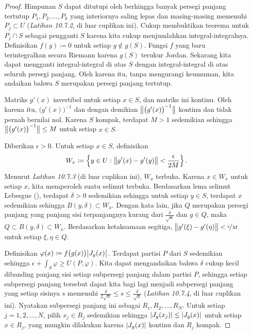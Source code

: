 \begin{proof}
Himpunan $S$ dapat ditutupi oleh berhingga banyak persegi panjang tertutup
$P_1,P_2,\ldots,P_k$ yang
interiornya saling lepas dan masing-masing memenuhi $P_j \subset U$
(\emph{Latihan 10.7.2}, di luar cuplikan ini).
Cukup membuktikan teorema untuk $P_j \cap S$ sebagai pengganti $S$
karena kita cukup menjumlahkan integral-integralnya.
Definisikan $f(y) \coloneqq 0$ untuk setiap $y \notin g(S)$.
Fungsi $f$ yang baru terintegralkan secara Riemann karena $g(S)$ terukur Jordan.
Sekarang kita dapat mengganti integral-integral di atas $S$ dengan integral-integral
di atas seluruh persegi panjang.
Oleh karena itu, tanpa mengurangi keumuman, kita andaikan bahwa $S$ merupakan persegi panjang tertutup.

Matriks $g'(x)$ invertibel untuk setiap $x \in S$,
dan matriks ini kontinu.  Oleh karena itu, ${\bigl(g'(x)\bigr)}^{-1}$
dan dengan demikian
$\bigl\lVert {{\bigl(g'(x)\bigr)}^{-1}} \bigr\rVert$ kontinu dan tidak pernah bernilai nol.
Karena $S$ kompak, terdapat $M > 1$ sedemikian sehingga
$\bigl\lVert {{\bigl(g'(x)\bigr)}^{-1}} \bigr\rVert \leq M$ untuk setiap $x \in S$.

Diberikan $\epsilon > 0$.
Untuk setiap $x \in S$, definisikan
\begin{equation*}
W_x \coloneqq
\left\{ y \in U : \bigl\lVert {g'(x)-g'(y)} \bigr\rVert < \frac{\epsilon}{2M} \right\} .
\end{equation*}
Menurut \emph{Latihan 10.7.3} (di luar cuplikan ini),
$W_x$ terbuka.
Karena $x \in W_x$ untuk setiap $x$, kita memperoleh suatu selimut terbuka.
Berdasarkan lema selimut Lebesgue
(),
terdapat $\delta > 0$ sedemikian sehingga
untuk setiap $y \in S$, terdapat $x$ sedemikian sehingga $B(y,\delta) \subset W_x$.
Dengan kata lain, jika $Q$ merupakan persegi panjang yang panjang sisi terpanjangnya kurang
dari $\frac{\delta}{\sqrt{n}}$ dan $y \in Q$, maka $Q \subset
B(y,\delta) \subset W_x$.  Berdasarkan ketaksamaan segitiga,
$\bigl\lVert {g'(\xi)-g'(\eta)} \bigr\rVert < \nicefrac{\epsilon}{M}$ untuk setiap $\xi, \eta \in Q$.

Definisikan $\varphi(x) \coloneqq f\bigl(g(x)\bigr) \bigl\lvert {J_g(x)} \bigr\rvert$.
Terdapat partisi $P$ dari $S$ sedemikian sehingga
$\epsilon + \int_S \varphi \geq U(P,\varphi)$.
Kita dapat mengandaikan bahwa $\delta$ cukup kecil dibanding panjang sisi
setiap subpersegi panjang dalam partisi $P$, sehingga setiap subpersegi panjang
tersebut dapat kita bagi lagi menjadi subpersegi panjang yang setiap sisinya $s$ memenuhi
$\frac{\delta}{2\sqrt{n}} \leq s \leq \frac{\delta}{\sqrt{n}}$
(\emph{Latihan 10.7.4}, di luar cuplikan ini).
Nyatakan subpersegi panjang ini sebagai
$R_1,R_2,\ldots,R_N$.
Untuk setiap $j=1,2,\dots,N$, pilih $x_j \in R_j$ sedemikian sehingga
$\lvert {J_g(x_j)} \rvert \leq \lvert {J_g(x)} \rvert$ untuk setiap $x \in R_j$,
yang mungkin dilakukan karena $\lvert {J_g(x)} \rvert$ kontinu dan $R_j$
kompak.


\end{proof}
